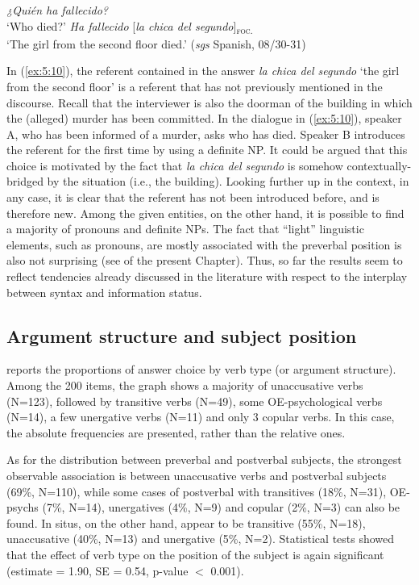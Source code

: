 \ea \label{ex:5:10}
\ea \textit{¿Quién ha fallecido?}\\
 ‘Who died?'
\ex  \textit{Ha fallecido} {[\textit{la chica del segundo}]\textsubscript{\textsc{foc.}}}\normalsize\\
‘The girl from the second floor died.' \hfill (\textit{sgs} Spanish, 08/30-31)     
\z \z


In (\ref{ex:5:10}), the referent contained in the answer \textit{la chica del segundo} `the girl from the second floor' is a referent that has not previously mentioned in the discourse. Recall that the interviewer is also the doorman of the building in which the (alleged) murder has been committed. In the dialogue in (\ref{ex:5:10}), speaker A, who has been informed of a murder, asks who has died. Speaker B introduces the referent for the first time by using a definite NP. It could be argued that this choice is motivated by the fact that \textit{la chica del segundo} is somehow contextually-bridged by the situation (i.e., the building). Looking further up in the context, in any case, it is clear that the referent has not been introduced before, and is therefore new.
Among the given entities, on the other hand, it is possible to find a majority of pronouns and definite NPs. The fact that ``light” linguistic elements, such as pronouns, are mostly associated with the preverbal position is also not surprising (see  of the present Chapter). Thus, so far the results seem to reflect tendencies already discussed in the literature with respect to the interplay between syntax and information status.


\subsection{Argument structure and subject position} \label{sub:6.6.3}
 reports the proportions of answer choice by verb type (or argument structure). Among the 200 items, the graph shows a majority of unaccusative verbs (N=123), followed by transitive verbs (N=49), some OE-psychological verbs (N=14), a few unergative verbs (N=11) and only 3 copular verbs. In this case, the absolute frequencies are presented, rather than the relative ones. 

\hspace*{-1.1pt}As for the distribution between preverbal and postverbal subjects, the strongest observable association is between unaccusative verbs and postverbal subjects (69\%, N=110), while some cases of postverbal with transitives (18\%, N=31), OE-psychs (7\%, N=14), unergatives (4\%, N=9) and copular (2\%, N=3) can also be found. In situs, on the other hand, appear to be transitive (55\%, N=18), unaccusative (40\%, N=13) and unergative (5\%, N=2). Statistical tests showed that the effect of verb type on the position of the subject is again significant (estimate = 1.90, SE = 0.54, p-value $<$ 0.001).

